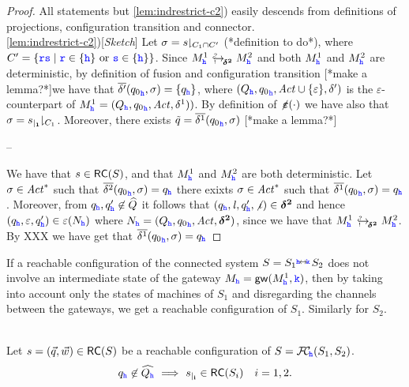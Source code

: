 \begin{proof}
All statements but \ref{lem:indrestrict-c2}) easily
descends from definitions of projections, configuration transition and connector.\\
\ref{lem:indrestrict-c2})[{\em Sketch}]
Let $\sigma=\parproj{s}{C_1\cap C'}$ (*definition to do*), where $C'=\Set{\ttr\tts\mid \ttr\in\Set{\hh} \text{ or }\tts\in\Set{\hh}}$.
Since $\emb{\bm{\delta^2}}{}{M^1_{\hh}}{M^2_{\hh}}$ and both $M^1_{\hh}$ and $M^2_{\hh}$ are deterministic,
by definition of fusion and configuration transition [*make a lemma?*]we have that $\overline{\delta'}({q_0}_\hh,\sigma) =\Set{q_\hh}$,
where  $(Q_\hh,{q_0}_\hh,\Act\cup\Set{\varepsilon},\delta')$ is the $\varepsilon$-counterpart of 
$M^1_{\hh}=(Q_\hh,{q_0}_\hh,\Act,\delta^1))$. 
By definition of $\noeps(\cdot)$ we have also that 
$\sigma=\parproj{\restrict{s}{1}}{C_1}$. Moreover, there exists $\tilde q = \overline{\delta^1}({q_0}_\hh,\sigma)$ [*make a lemma?*]

--

We have that $s\in \RS(S)$, and that $M^1_{\hh}$ and $M^2_{\hh}$ are both deterministic.
Let $\sigma\in\Act^*$ such that $\overline{\delta^2}({q_0}_\hh,\sigma) =q_\hh$
there exixts $\sigma\in\Act^*$ such that $\overline{\delta^1}({q_0}_\hh,\sigma) =q_\hh$. 
Moreover, from $q_\hh,q'_\hh\not\in\widehat{Q}$ it follows that $(q_\hh,\elle,q'_\hh,\nintf)\in\bm{\delta^2}$
and hence $(q_\hh,\varepsilon,q'_\hh)\in \varepsilon(N_{\hh})$ where
$N_{\hh}=(Q_\hh,{q_0}_\hh,\Act,\bm{\delta^2})$, since we have that
$\emb{\bm{\delta^2}}{}{M^1_{\hh}}{M^2_{\hh}}$.
By XXX we have get that  $\overline{\delta^1}({q_0}_\hh,\sigma) =q_\hh$

\end{proof}



If a reachable configuration of the connected system $S={S_{1}}\connect{\HH}{\KK} {S_{2}}$ does not involve an intermediate state of the gateway
$M_\HH = \gateway{M^1_\HH, \KK}$, %
then by taking into account only the states of machines of $S_1$ and disregarding
the channels between the gateways, %
we get a
reachable configuration of $S_1$. Similarly for $S_2$.

\begin{lemma}
\label{lem:nohatrestrict}\hfill\\
Let $s= (\vec{q},\vec{w}) \in \RS(S)$ be a reachable configuration of 
$S =\fusioncomp_{\!\hh}(S_1,S_2)$.
$${q}_\HH\not\in\widehat{Q_\hh} \implies 
\restrict{s}{i}\in \RS(S_i) \quad i=1,2.$$
\end{lemma}

